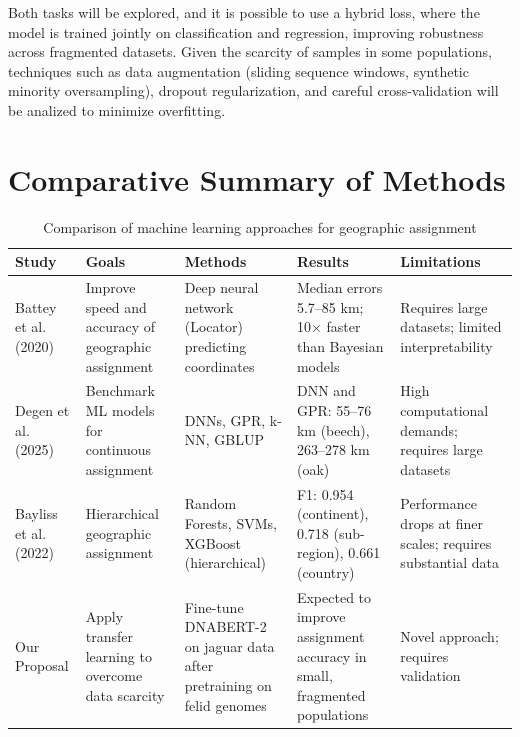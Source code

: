Both tasks will be explored, and it is possible to use a hybrid loss, where the model is trained jointly on classification and regression, improving robustness across fragmented datasets. Given the scarcity of samples in some populations, techniques such as data augmentation (sliding sequence windows, synthetic minority oversampling), dropout regularization, and careful cross-validation will be analized to minimize overfitting.


\section{Comparative Summary of Methods}

\begin{table}[H]
\centering
\caption{Comparison of machine learning approaches for geographic assignment}
\label{tab:ml_methods_comparison}
\small
\begin{tabular}{p{2.5cm}p{2.5cm}p{2.5cm}p{2.5cm}p{2.5cm}}
\hline
\textbf{Study} & \textbf{Goals} & \textbf{Methods} & \textbf{Results} & \textbf{Limitations} \\
\hline
Battey et al. (2020) & Improve speed and accuracy of geographic assignment & Deep neural network (Locator) predicting coordinates & Median errors 5.7–85 km; 10× faster than Bayesian models & Requires large datasets; limited interpretability \\
\hline
Degen et al. (2025) & Benchmark ML models for continuous assignment & DNNs, GPR, k-NN, GBLUP & DNN and GPR: 55–76 km (beech), 263–278 km (oak) & High computational demands; requires large datasets \\
\hline
Bayliss et al. (2022) & Hierarchical geographic assignment & Random Forests, SVMs, XGBoost (hierarchical) & F1: 0.954 (continent), 0.718 (sub-region), 0.661 (country) & Performance drops at finer scales; requires substantial data \\
\hline
Our Proposal & Apply transfer learning to overcome data scarcity & Fine-tune DNABERT-2 on jaguar data after pretraining on felid genomes & Expected to improve assignment accuracy in small, fragmented populations & Novel approach; requires validation \\
\hline
\end{tabular}
\end{table}
